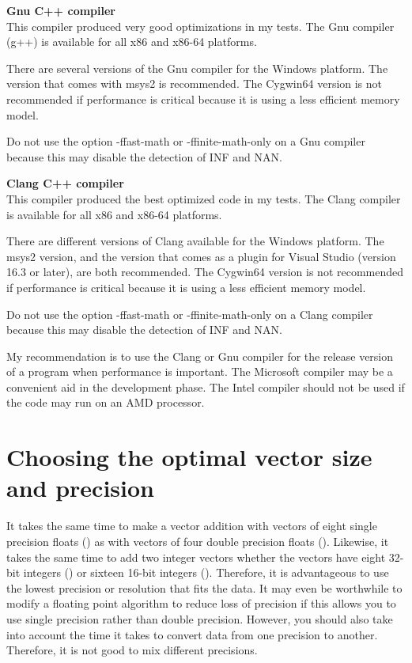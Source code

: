 \documentclass[vcl_manual.tex]{subfiles}
\begin{document}
\textbf{Gnu C++ compiler}\\
This compiler produced very good optimizations in my tests. The Gnu compiler (g++) is available for all x86 and x86-64 platforms. 

There are several versions of the Gnu compiler for the Windows platform. The version that comes with msys2 is recommended. The Cygwin64 version is not recommended if performance is critical because it is using a less efficient memory model.

Do not use the option -ffast-math or -ffinite-math-only on a Gnu compiler because
this may disable the detection of INF and NAN.


\textbf{Clang C++ compiler}\\
This compiler produced the best optimized code in my tests. The Clang compiler is available for all x86 and x86-64 platforms. 

There are different versions of Clang available for the Windows platform. 
The msys2 version, and the version that comes as a plugin for Visual Studio (version 16.3 or later), are both recommended.
The Cygwin64 version is not recommended if performance is critical because it is using a less efficient memory model.

Do not use the option -ffast-math or -ffinite-math-only on a Clang compiler because this may disable the detection of INF and NAN.

My recommendation is to use the Clang or Gnu compiler for the release version of a program when performance is important. The Microsoft compiler may be a convenient aid in the development phase. The Intel compiler should not be used if the code may run on an AMD processor.


\section{Choosing the optimal vector size and precision} \label{ChoosingOptimalVectorSize}

It takes the same time to make a vector addition with vectors of eight single precision floats () as with vectors of four double precision floats (). Likewise, it takes the same time to add two integer vectors whether the vectors have eight 32-bit integers () or sixteen 16-bit integers (). Therefore, it is advantageous to use the lowest precision or resolution that fits the data. It may even be worthwhile to modify a floating point algorithm to reduce loss of precision if this allows you to use single precision rather than double precision. However, you should also take into account the time it takes to convert data from one precision to another. Therefore, it is not good to mix different precisions.
\end{document}
